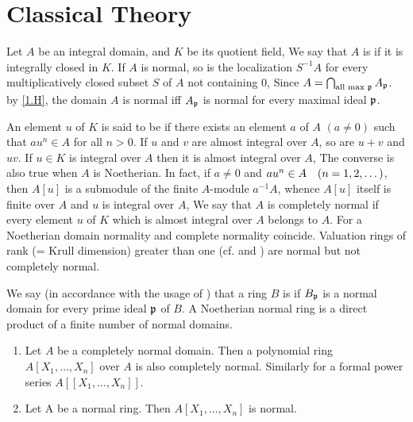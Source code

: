 \documentclass[../main]{subfiles}
\begin{document}
\section{Classical Theory}\label{sec:17}

\newparagraph Let $A$ be an integral domain, and $K$ be its quotient field, We say that $A$ is  if it is integrally closed in $K$. If $A$ is normal, so is the localization $S^{-1}A$ for every multiplicatively closed subset $S$ of $A$ not containing $0$,
Since $A = \bigcap_{\text{all max }\mathfrak{p}} A_{\mathfrak{p}}$. by \ref{1.H}, the domain $A$ is normal iff $A_{\mathfrak{p}}$ is normal for every maximal ideal $\mathfrak{p}$. 

An element $u$ of $K$ is said to be  if there exists an element $a$ of $A$ $(a\neq 0)$ such that $au^n \in A$ for all $n>0$. If $u$ and $v$ are almost integral over $A$, so are $u+v$ and $uv$. If $u\in K$ is integral over $A$ then it is almost
integral over $A$, The converse is also true when $A$ is Noetherian. In fact, if $a\neq 0$ and $au^n\in A\for{n=1,2,\dots}$, then $A[u]$ is a submodule of the finite $A$-module $a^{-1}A$, whence $A[u]$ itself is finite over $A$ and $u$ is integral over $A$, We say that $A$ is completely normal if every element $u$ of $K$ which is
almost integral over $A$ belongs to $A$. For a Noetherian domain normality and complete normality coincide. Valuation rings of rank (= Krull dimension) greater than one (cf.\cite{nagata1975local} and \cite{zariski2014commutative}) are normal but not completely normal. 

We say (in accordance with the usage of \cite{egaIII1}) that a ring $B$ is  if $B_{\mathfrak{p}}$ is a normal domain for every prime ideal $\mathfrak{p}$ of $B$. A Noetherian normal ring is a direct product of a finite number of normal domains.

\begin{parproposition}
\begin{enumerate}[label=(\arabic*)]
    \item Let $A$ be a completely normal domain. Then a polynomial ring $A[X_1,\dots,X_n]$ over $A$ is also completely normal. Similarly for a formal power series $A[[X_1,\dots,X_n]]$. 
    \item Let A be a normal ring. Then $A[X_1,\dots,X_n]$ is normal.
\end{enumerate}
\end{parproposition}
\end{document}

